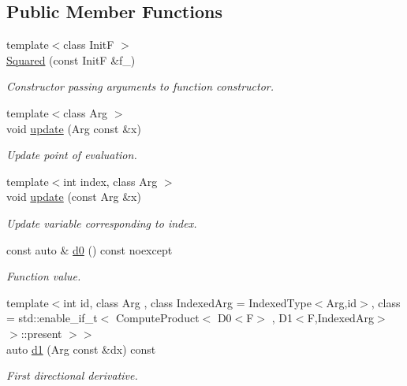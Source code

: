 \subsection*{Public Member Functions}
\begin{DoxyCompactItemize}
\item 
{\footnotesize template$<$class Init\+F $>$ }\\\hyperlink{structFunG_1_1MathematicalOperations_1_1Squared_a60dab55accc3957f54b0eafece720b5d}{Squared} (const Init\+F \&f\+\_\+)
\begin{DoxyCompactList}\small\item\em Constructor passing arguments to function constructor. \end{DoxyCompactList}\item 
{\footnotesize template$<$class Arg $>$ }\\void \hyperlink{structFunG_1_1MathematicalOperations_1_1Squared_abea95d90dc29ac105c43f4eadde84cab}{update} (Arg const \&x)
\begin{DoxyCompactList}\small\item\em Update point of evaluation. \end{DoxyCompactList}\item 
{\footnotesize template$<$int index, class Arg $>$ }\\void \hyperlink{structFunG_1_1MathematicalOperations_1_1Squared_a1d890825175df9b79fd73bf8248496ad}{update} (const Arg \&x)
\begin{DoxyCompactList}\small\item\em Update variable corresponding to index. \end{DoxyCompactList}\item 
const auto \& \hyperlink{structFunG_1_1MathematicalOperations_1_1Squared_a1befce58c84eac92ab7afa974ecaf5b0}{d0} () const noexcept
\begin{DoxyCompactList}\small\item\em Function value. \end{DoxyCompactList}\item 
{\footnotesize template$<$int id, class Arg , class Indexed\+Arg  = Indexed\+Type$<$\+Arg,id$>$, class  = std\+::enable\+\_\+if\+\_\+t$<$ Compute\+Product$<$ D0$<$\+F$>$ , D1$<$\+F,\+Indexed\+Arg$>$ $>$\+::present $>$$>$ }\\auto \hyperlink{structFunG_1_1MathematicalOperations_1_1Squared_a02f17b7976e0f72e15bc73d1ae905988}{d1} (Arg const \&dx) const 
\begin{DoxyCompactList}\small\item\em First directional derivative. \end{DoxyCompactList}\item 

\end{DoxyCompactItemize}
